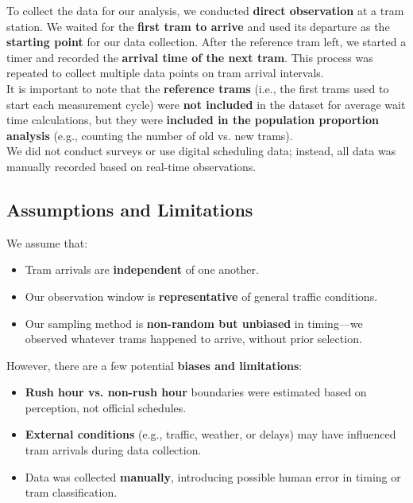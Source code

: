 \documentclass[a4paper, 10pt]{article}
\begin{document}
		\begin{spacing}{1.2}
			To collect the data for our analysis, we conducted \textbf{direct observation} at a tram station. 
			\noindent We waited for the \textbf{first tram to arrive} and used its departure as the \textbf{starting point} for our data collection. 
			After the reference tram left, we started a timer and recorded the \textbf{arrival time of the next tram}. 
			This process was repeated to collect multiple data points on tram arrival intervals. \\

			\noindent It is important to note that the \textbf{reference trams} (i.e., the first trams used to start each measurement cycle) were 
			\textbf{not included} in the dataset for average wait time calculations, but they were 
			\textbf{included in the population proportion analysis} (e.g., counting the number of old vs. new trams). \\

			\noindent We did not conduct surveys or use digital scheduling data; instead, all data was manually recorded based on real-time observations.
		\end{spacing}

			\subsection*{Assumptions and Limitations}
				We assume that:
				\begin{itemize}
						\item Tram arrivals are \textbf{independent} of one another.
						\item Our observation window is \textbf{representative} of general traffic conditions.
						\item Our sampling method is \textbf{non-random but unbiased} in timing—we observed whatever trams happened to arrive, without prior selection.
				\end{itemize}

				\noindent However, there are a few potential \textbf{biases and limitations}:
				\begin{itemize}
						\item \textbf{Rush hour vs. non-rush hour} boundaries were estimated based on perception, not official schedules.
						\item \textbf{External conditions} (e.g., traffic, weather, or delays) may have influenced tram arrivals during data collection.
						\item Data was collected \textbf{manually}, introducing possible human error in timing or tram classification.
				\end{itemize}
\end{document}
